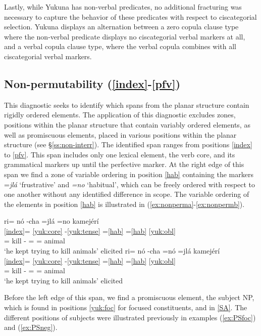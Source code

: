 \documentclass[output=paper]{langscibook}
\begin{document}
Lastly, while Yukuna has non-verbal predicates, no additional fracturing was necessary to capture the behavior of these predicates with respect to ciscategorial selection. Yukuna displays an alternation between a zero copula clause type where the non-verbal predicate displays no ciscategorial verbal markers at all, and a verbal copula clause type, where the verbal copula combines with all ciscategorial verbal markers.

\subsection{Non-permutability (\ref{index}-\ref{pfv})}
\label{ss:nonperm}

This diagnostic seeks to identify which spans from the planar structure contain rigidly ordered elements. The application of this diagnostic excludes zones, positions within the planar structure that contain variably ordered elements, as well as promiscuous elements, placed in various positions within the planar structure (see §\ref{ss:non-interr}). 
The identified span ranges from positions \ref{index} to \ref{pfv}. This span includes only one lexical element, the verb core, and its grammatical markers up until the perfective marker. At the right edge of this span we find a zone of variable ordering in position \ref{hab} containing the markers =\textit{jlá} `frustrative' and \textit{=no} `habitual', which can be freely ordered with respect to one another without any identified difference in scope. The variable ordering of the elements in position \ref{hab} is illustrated in (\ref{ex:nonperma}-\ref{ex:nonpermb}).

	\ea \label{ex:nonperma}
    \glll ri= nó -cha =jlá =no kamejérí	\\
		   \ref{index}= \ref{yuk:core} -\ref{yuk:tense} =\ref{hab} =\ref{hab} \ref{yuk:obl} \\
	        \Tsg{}= kill -\Pst{} =\Frust{} =\Hab{} animal	\\
	\glt `he kept trying to kill animals' \hfill elicited
		\ex \label{ex:nonpermb}
	\glll ri= nó -cha =nó =jlá kamejérí	\\
	 \ref{index}= \ref{yuk:core} -\ref{yuk:tense} =\ref{hab} =\ref{hab} \ref{yuk:obl} \\
		\Tsg{}= kill -\Pst{} =\Hab{} =\Frust{} animal	\\
		\glt `he kept trying to kill animals' \hfill elicited
	\z
	
Before the left edge of this span, we find a promiscuous element, the subject NP, which is found in positions \ref{yuk:foc} for focused constituents, and in \ref{SA}. The different positions of subjects were illustrated previously in examples (\ref{ex:PSfoc}) and (\ref{ex:PSneg}).
\end{document}
